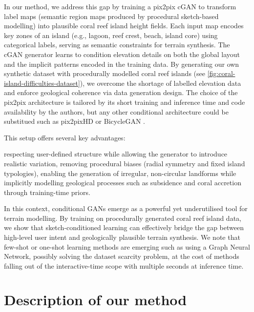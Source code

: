 \midConclusion

In our method, we address this gap by training a pix2pix cGAN to transform label maps (semantic region maps produced by procedural sketch-based modelling) into plausible coral reef island height fields. Each input map encodes key zones of an island (e.g., lagoon, reef crest, beach, island core) using categorical labels, serving as semantic constraints for terrain synthesis. The cGAN generator learns to condition elevation details on both the global layout and the implicit patterns encoded in the training data. By generating our own synthetic dataset with procedurally modelled coral reef islands (see \cref{fig:coral-island-difficulties-dataset}), we overcome the shortage of labelled elevation data and enforce geological coherence via data generation design. The choice of the pix2pix architecture is tailored by its short training and inference time and code availability by the authors, but any other conditional architecture could be substitued such as pix2pixHD or BicycleGAN \cite{Wang2018,Zhu2018NN}.

This setup offers several key advantages: 
\begin{Itemize}
    \Item{} respecting user-defined structure while allowing the generator to introduce realistic variation,
    \Item{} removing procedural biases (radial symmetry and fixed island typologies),
    \Item{} enabling the generation of irregular, non-circular landforms while implicitly modelling geological processes such as subsidence and coral accretion through training-time priors.
\end{Itemize}

In this context, conditional GANs emerge as a powerful yet underutilised tool for terrain modelling. By training on procedurally generated coral reef island data, we show that sketch-conditioned learning can effectively bridge the gap between high-level user intent and geologically plausible terrain synthesis. We note that few-shot or one-shot learning methods are emerging such as \cite{Liu2025} using a Graph Neural Network, possibly solving the dataset scarcity problem, at the cost of methods falling out of the interactive-time scope with multiple seconds at inference time.




\section{Description of our method}
\label{sec:coral-island-method-description}


